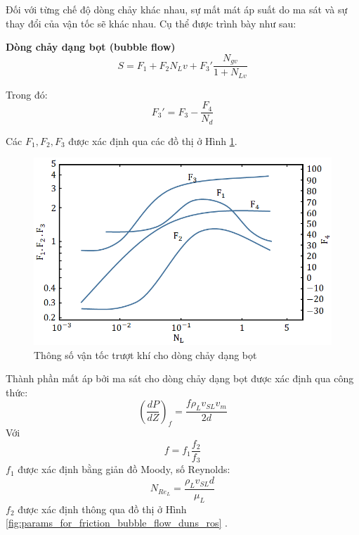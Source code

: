 \documentclass[12pt,a4paper]{report}
\begin{document}
Đối với từng chế độ dòng chảy khác nhau, sự mất mát áp suất do ma sát và sự thay đổi của vận tốc sẽ khác nhau. Cụ thể được trình bày như sau:

\textbf{Dòng chảy dạng bọt (bubble flow)}
	\begin{equation}
    S = F_1 +F_2N_Lv + F_3'\dfrac{N_{gv}}{1+N_{Lv}}
	\end{equation}
	
Trong đó: 
	\begin{equation}
   F_3' = F_3 - \dfrac{F_4}{N_d}
	\end{equation}
	
Các $F_1, F_2, F_3$ được xác định qua các đồ thị ở Hình \ref{fig:v_gas_slip_duns_ros_bubble_flow}.
	\begin{figure}[h]
		\centering
		\includegraphics[scale=0.75]{Fig/v_gas_slip_duns_ros_bubble_flow.png}
		\caption[Thông số vận tốc trượt khí cho dòng chảy dạng bọt]{Thông số vận tốc trượt khí cho dòng chảy dạng bọt \cite{brill1999multiphase}}
		\label{fig:v_gas_slip_duns_ros_bubble_flow}
	\end{figure}
Thành phần mất áp bởi ma sát cho dòng chảy dạng bọt được xác định qua công thức:
	\begin{equation}
    	(\dfrac{dP}{dZ})_f = \dfrac{f\rho_Lv_{SL}v_m}{2d}
	\end{equation}
Với 
	\begin{equation}
    	f = f_1\dfrac{f_2}{f_3}
	\end{equation}
$f_1$ được xác định bằng giản đồ Moody, số Reynolds:
	\begin{equation}
    	N_{Re_L} = \dfrac{\rho_Lv_{SL}d}{\mu_L}
	\end{equation}
$f_2$ được xác định thông qua đồ thị ở Hình \ref{fig:params_for_friction_bubble_flow_duns_ros} \cite{brill1999multiphase}.
\end{document}

